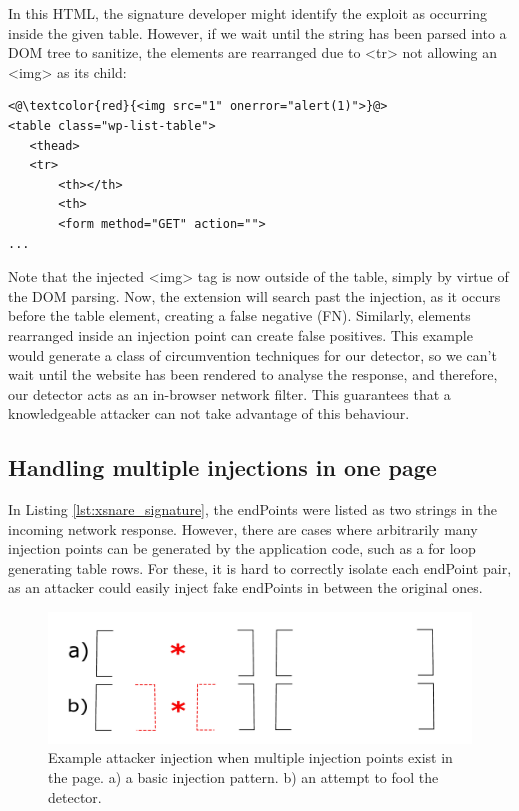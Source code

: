 In this HTML, the signature developer might identify the exploit as
occurring inside the given table. However, if we wait until the string
has been parsed into a DOM tree to sanitize, the elements are
rearranged due to <tr> not allowing an <img> as its child:

\begin{lstlisting}
<@\textcolor{red}{<img src="1" onerror="alert(1)">}@>
<table class="wp-list-table">
   <thead>
   <tr>
	   <th></th>
	   <th>
       <form method="GET" action="">
...
\end{lstlisting}

Note that the injected <img> tag is now outside of the table, simply
by virtue of the DOM parsing. Now, the extension will search past the
injection, as it occurs before the table element, creating a false
negative (FN). Similarly, elements rearranged inside an injection
point can create false positives. This example would generate a class
of circumvention techniques for our detector, so we can't wait until
the website has been rendered to analyse the response, and therefore,
our detector acts as an in-browser network filter. This guarantees
that a knowledgeable attacker can not take advantage of this
behaviour.

\subsection{Handling multiple injections in one page} \label{multiple_injections}

In Listing \ref{lst:xsnare_signature}, the endPoints were listed as
two strings in the incoming network response. However, there are cases
where arbitrarily many injection points can be generated by the
application code, such as a for loop generating table rows. For these,
it is hard to correctly isolate each endPoint pair, as an attacker
could easily inject fake endPoints in between the original ones.

\begin{figure}[h]
	\includegraphics[scale=0.25]{img/attacker_injection_compound.pdf}
	\caption{Example attacker injection when multiple injection points exist in the page. a) a basic injection pattern. b) an attempt to fool the detector.}
	\label{fig:attacker_injection}
\end{figure}

